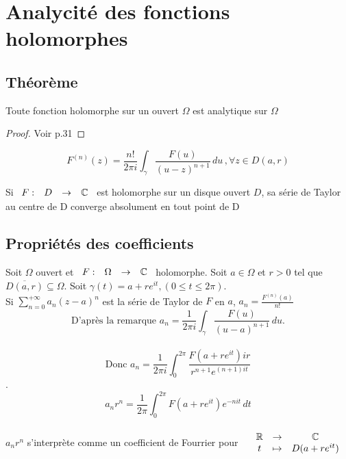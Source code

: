 \documentclass[]{report}
\begin{document}
\section{Analycité des fonctions holomorphes}

\subsection{Théorème}

\begin{tm}{}{}
    Toute fonction holomorphe sur un ouvert $\Omega$ est analytique sur $\Omega$
\end{tm}

\begin{proof}{}{}
    Voir p.31
\end{proof}

\begin{re}{}{}
    $$F^{(n)}(z)=\frac{n!}{2 \pi i}\int_\gamma \frac{F(u)}{(u-z)^{n+1}}\,du\,,\forall z\in D(a,r)$$
\end{re}

\begin{tm}{}{}
    Si $\begin{array}{ccccc}
F : & D & \to & \mathbb{C}
\end{array}$ est holomorphe sur un disque ouvert $D$, sa série de Taylor au centre de D converge absolument en tout point de D
\end{tm}

\subsection{Propriétés des coefficients}

Soit $\Omega$ ouvert et $\begin{array}{ccccc}
F : & \Omega & \to & \mathbb{C}
\end{array}$ holomorphe. Soit $a\in \Omega$ et $r>0$ tel que $\overline{D(a,r)}\subseteq \Omega$. Soit $\gamma(t)=a+re^{it},(0\le t\le 2\pi)$.\\
Si $\displaystyle{\sum_{n=0}^{+\infty}a_n(z-a)^n}$ est la série de Taylor de $F$ en $a$, $a_n= \frac{F^{(n)}(a)}{n!}$\\
$$\text{D'après la remarque } \displaystyle{a_n=\frac{1}{2\pi i}\int_\gamma\frac{F(u)}{(u-a)^{n+1}}\,du}.$$\\
$$\text{Donc } \displaystyle{a_n=\frac{1}{2\pi i}\int_{0}^{2\pi}\frac{F(a+re^{it})ir}{r^{n+1}e^{(n+1)it}}}$$.\\
$$a_nr^n=\frac{1}{2\pi}\int_0^{2\pi}F(a+re^{it})e^{-nit}\,dt$$\\
$a_nr^n$ s'interprète comme un coefficient de Fourrier pour $\begin{array}{ccccc}
& \mathbb{R} & \to & \mathbb{C} \\
& t & \mapsto & D(a+re^{it})
\end{array}$
\end{document}
